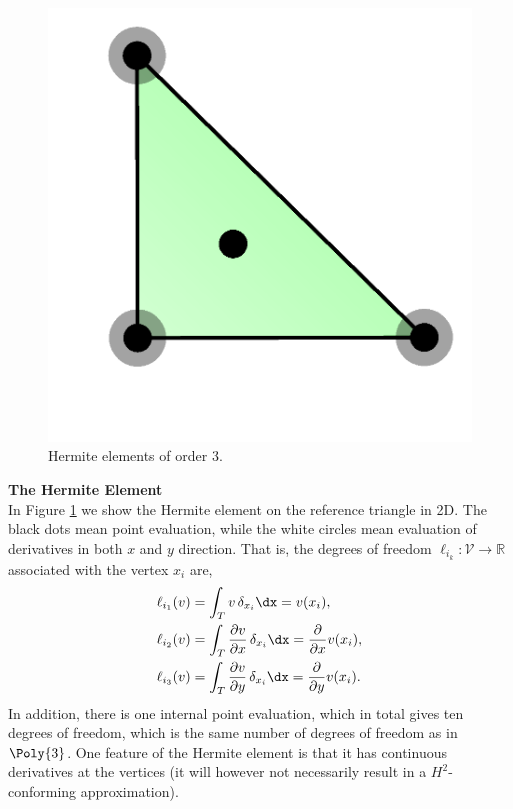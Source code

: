 \begin{figure}
  \centering
  \includegraphics[width=\smallfig]{chapters/kirby-6/png/HER_2d.png}
  \caption{Hermite elements of order 3.}
  \label{Hermite}
\end{figure}

\begin{example}{\bf{ The Hermite Element}} \\
In Figure \ref{Hermite} we show the Hermite element on the reference
triangle in 2D. The black dots mean point evaluation, while the white
circles mean evaluation of derivatives in both $x$ and $y$ direction.
That is, the degrees of freedom $\ell_{i_k} : \mathcal{V} \rightarrow
\mathbb{R}$ associated with the vertex $x_i$ are,
\begin{align}
\ell_{i_1} (v) &= \int_{T} {v} \, \delta_{x_i} \dx = v(x_i),    \\
\ell_{i_2} (v) &= \int_{T} \frac{\partial{v}}{\partial x} \, \delta_{x_i} \dx = \frac{\partial}{\partial x} v(x_i),  \\
\ell_{i_3} (v) &= \int_{T} \frac{\partial{v}}{\partial y} \, \delta_{x_i} \dx = \frac{\partial}{\partial y} v(x_i).
\end{align}
In addition, there is one internal point evaluation, which in total gives
ten degrees of freedom, which is the same number of degrees of freedom as
in $\Poly{3}$.  One feature of the Hermite element is that it has continuous
derivatives at the vertices (it will however not necessarily result in
a $H^2$-conforming approximation).
\end{example}

